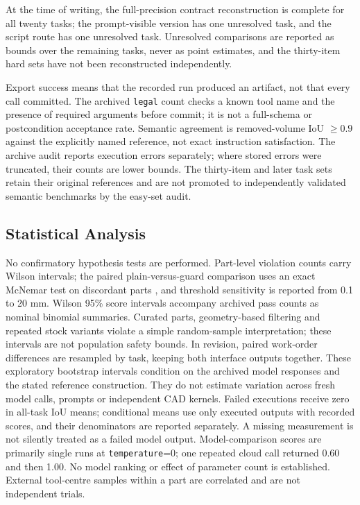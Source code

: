 At the time of writing, the full-precision contract reconstruction is complete for all twenty tasks; the prompt-visible version has one unresolved task, and the script route has one unresolved task. Unresolved comparisons are reported as bounds over the remaining tasks, never as point estimates, and the thirty-item hard sets have not been reconstructed independently.

Export success means that the recorded run produced an artifact, not that every call committed. The archived \texttt{legal} count checks a known tool name and the presence of required arguments before commit; it is not a full-schema or postcondition acceptance rate. Semantic agreement is removed-volume IoU $\geq0.9$ against the explicitly named reference, not exact instruction satisfaction. The archive audit reports execution errors separately; where stored errors were truncated, their counts are lower bounds. The thirty-item and later task sets retain their original references and are not promoted to independently validated semantic benchmarks by the easy-set audit.

\subsection{Statistical Analysis}

No confirmatory hypothesis tests are performed. Part-level violation counts carry Wilson intervals; the paired plain-versus-guard comparison uses an exact McNemar test on discordant parts \cite{McNemar1947}, and threshold sensitivity is reported from 0.1 to 20 mm.  Wilson 95\% score intervals \cite{Wilson1927} accompany archived pass counts as nominal binomial summaries. Curated parts, geometry-based filtering and repeated stock variants violate a simple random-sample interpretation; these intervals are not population safety bounds. In revision, paired work-order differences are resampled by task, keeping both interface outputs together. These exploratory bootstrap intervals condition on the archived model responses and the stated reference construction. They do not estimate variation across fresh model calls, prompts or independent CAD kernels. Failed executions receive zero in all-task IoU means; conditional means use only executed outputs with recorded scores, and their denominators are reported separately. A missing measurement is not silently treated as a failed model output. Model-comparison scores are primarily single runs at \texttt{temperature}=0; one repeated cloud call returned 0.60 and then 1.00. No model ranking or effect of parameter count is established. External tool-centre samples within a part are correlated and are not independent trials.


